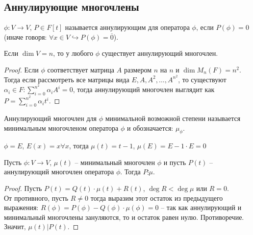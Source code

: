 \subsection{Аннулирующие многочлены}

\begin{definition}
    $\phi: V \to V$, $P \in F[t]$ называется аннулирующим для оператора $\phi$, если $P(\phi) = 0$ (иначе говоря: $\forall x \in V \hookrightarrow P(\phi) = \overline{0}$).
\end{definition}

\begin{note}
    Если $\dim V = n$, то у любого $\phi$ существует аннулирующий многочлен.
\end{note}

\begin{proof}
    Если $\phi$ соответствует матрица $A$ размером $n$ на $n$ и $\dim M_n(F) = n^2$. \\
    Тогда если рассмотреть все матрицы вида $E, A, A^2, \dots, A^{n^2}$, то существуют $\alpha_i \in F: \sum_{i = 0}^{n^2} \alpha_i A^i = 0$, тогда аннулирующий многочлен выглядит как $P = \sum_{i = 0}^{n^2} \alpha_i t^i$.
\end{proof}

\begin{definition}
    Аннулирующий многочлен для $\phi$ минимальной возможной степени называется минимальным многочленом оператора $\phi$ и обозначается: $\mu_{\phi}$.
\end{definition}

\begin{example}
    $\phi = E$, $E(x) = x \forall x$, тогда $\mu(t) = t - 1$, $\mu(E) = E - 1 \cdot E = 0$
\end{example}

\begin{theorem}
    \label{th4.5}
    Пусть $\phi: V \to V$, $\mu(t)$ -- минимальный многочлен $\phi$ и пусть $P(t)$ -- аннулирующий многочлен оператора $\phi$. Тогда $P \vdots \mu$.
\end{theorem}

\begin{proof}
    Пусть $P(t) = Q(t) \cdot \mu(t) + R(t)$, $\deg R < \deg \mu$ или $R = 0$. \\
    От противного, пусть $R \neq 0$ тогда выразим этот остаток из предыдущего выражения: 
    $R(\phi) = P(\phi) - Q(\phi) \cdot \mu (\phi) = 0$ -- так как аннулирующий и минимальный 
    многочлены зануляются, то и остаток равен нулю. Противоречие. Значит, $\mu(t) \vert P(t)$.
\end{proof}


